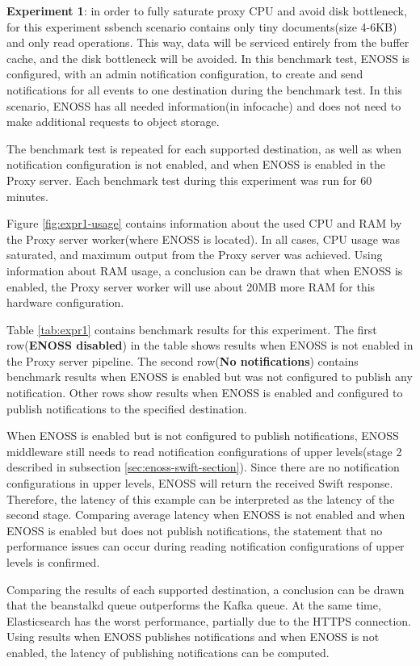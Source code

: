    \textbf{Experiment 1}: in order to fully saturate proxy CPU and avoid disk bottleneck, for this experiment ssbench scenario contains only tiny documents(size 4-6KB) and only read operations. This way, data will be serviced entirely from the buffer cache, and the disk bottleneck will be avoided. In this benchmark test, ENOSS is configured, with an admin notification configuration, to create and send notifications for all events to one destination during the benchmark test. In this scenario, ENOSS has all needed information(in infocache) and does not need to make additional requests to object storage.

    The benchmark test is repeated for each supported destination, as well as when notification configuration is not enabled, and when ENOSS is enabled in the Proxy server. Each benchmark test during this experiment was run for 60 minutes.

    Figure \ref{fig:expr1-usage} contains information about the used CPU and RAM by the Proxy server worker(where ENOSS is located). In all cases, CPU usage was saturated, and maximum output from the Proxy server was achieved. Using information about RAM usage, a conclusion can be drawn that when ENOSS is enabled, the Proxy server worker will use about 20MB more RAM for this hardware configuration.

    Table \ref{tab:expr1} contains benchmark results for this experiment. The first row(\textbf{ENOSS disabled}) in the table shows results when ENOSS is not enabled in the Proxy server pipeline. The second row(\textbf{No notifications}) contains benchmark results when ENOSS is enabled but was not configured to publish any notification. Other rows show results when ENOSS is enabled and configured to publish notifications to the specified destination.

    When ENOSS is enabled but is not configured to publish notifications, ENOSS middleware still needs to read notification configurations of upper levels(stage 2 described in subsection \ref{sec:enoss-swift-section}). Since there are no notification configurations in upper levels, ENOSS will return the received Swift response. Therefore, the latency of this example can be interpreted as the latency of the second stage. Comparing average latency when ENOSS is not enabled and when ENOSS is enabled but does not publish notifications, the statement that no performance issues can occur during reading notification configurations of upper levels is confirmed.

    Comparing the results of each supported destination, a conclusion can be drawn that the beanstalkd queue outperforms the Kafka queue. At the same time, Elasticsearch has the worst performance, partially due to the HTTPS connection. Using results when ENOSS publishes notifications and when ENOSS is not enabled, the latency of publishing notifications can be computed.

